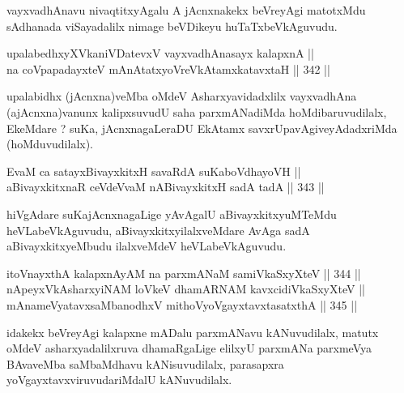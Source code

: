 \begin{artha}
vayxvadhAnavu nivaqtitxyAgalu A jAcnxnakekx beVreyAgi matotxMdu
sAdhanada viSayadalilx nimage beVDikeyu huTaTxbeVkAguvudu.
\end{artha}

\begin{shl}
\footnotemark[1]upalabedhxyXVkaniVDatevxV vayxvadhAnasayx kalapxnA || \\
na coVpapadayxteV mAnAtatxyoVreVkAtamxkatavxtaH \hfill || 342 ||  
\end{shl}

\begin{artha}
upalabidhx (jAcnxna)veMba oMdeV Asharxyavidadxlilx
vayxvadhAna (ajAcnxna)vanunx kalipxsuvudU saha parxmANadiMda hoMdibaruvudilalx, EkeMdare ? suKa, jAcnxnagaLeraDU EkAtamx
savxrUpavAgiveyAdadxriMda (hoMduvudilalx).
\end{artha}


\begin{shl}
EvaM ca satayxBivayxkitxH savaRdA suKaboVdhayoVH || \\
aBivayxkitxnaR ceVdeVvaM nABivayxkitxH sadA tadA \hfill || 343 ||  
\end{shl}

\begin{artha}
hiVgAdare suKajAcnxnagaLige yAvAgalU aBivayxkitxyuMTeMdu
heVLabeVkAguvudu, aBivayxkitxyilalxveMdare AvAga sadA
aBivayxkitxyeMbudu ilalxveMdeV heVLabeVkAguvudu.
\end{artha}

\begin{shl}
itoV\s nayxthA kalapxnAyAM na parxmANaM samiVkaSxyXteV \hfill || 344 ||  \\
nApeyxVkAsharxyiNAM loVkeV dhamARNAM kavxcidiVkaSxyXteV || \\
mAnameVyatavxsaMbanodhxV mithoVyoVgayxtavxtasatxthA \hfill || 345 ||  
\end{shl}

\begin{artha}
idakekx beVreyAgi kalapxne mADalu parxmANavu kANuvudilalx, matutx oMdeV asharxyadalilxruva dhamaRgaLige elilxyU parxmANa parxmeVya BAvaveMba saMbaMdhavu kANisuvudilalx, parasapxra yoVgayxtavxviruvudariMdalU kANuvudilalx.
\end{artha}

